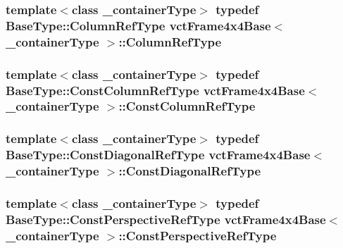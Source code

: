 \subsubsection[{Column\+Ref\+Type}]{\setlength{\rightskip}{0pt plus 5cm}template$<$class \+\_\+container\+Type$>$ typedef {\bf Base\+Type\+::\+Column\+Ref\+Type} {\bf vct\+Frame4x4\+Base}$<$ \+\_\+container\+Type $>$\+::{\bf Column\+Ref\+Type}}\label{classvct_frame4x4_base_a5c1b952e27a3cafa0cc196c2a36c33e7}
\hypertarget{classvct_frame4x4_base_a3942845e934c9ac1ede2d499f92a760b}{}
\subsubsection[{Const\+Column\+Ref\+Type}]{\setlength{\rightskip}{0pt plus 5cm}template$<$class \+\_\+container\+Type$>$ typedef {\bf Base\+Type\+::\+Const\+Column\+Ref\+Type} {\bf vct\+Frame4x4\+Base}$<$ \+\_\+container\+Type $>$\+::{\bf Const\+Column\+Ref\+Type}}\label{classvct_frame4x4_base_a3942845e934c9ac1ede2d499f92a760b}
\hypertarget{classvct_frame4x4_base_ae8ff29e1d404cc75dd2163bf99446d90}{}
\subsubsection[{Const\+Diagonal\+Ref\+Type}]{\setlength{\rightskip}{0pt plus 5cm}template$<$class \+\_\+container\+Type$>$ typedef {\bf Base\+Type\+::\+Const\+Diagonal\+Ref\+Type} {\bf vct\+Frame4x4\+Base}$<$ \+\_\+container\+Type $>$\+::{\bf Const\+Diagonal\+Ref\+Type}}\label{classvct_frame4x4_base_ae8ff29e1d404cc75dd2163bf99446d90}
\hypertarget{classvct_frame4x4_base_a47161d0a7598341722759640af9413e5}{}
\subsubsection[{Const\+Perspective\+Ref\+Type}]{\setlength{\rightskip}{0pt plus 5cm}template$<$class \+\_\+container\+Type$>$ typedef Base\+Type\+::\+Const\+Perspective\+Ref\+Type {\bf vct\+Frame4x4\+Base}$<$ \+\_\+container\+Type $>$\+::{\bf Const\+Perspective\+Ref\+Type}}\label{classvct_frame4x4_base_a47161d0a7598341722759640af9413e5}
\hypertarget{classvct_frame4x4_base_a1f3226ad5b15ec1edb95cfe760eacc4f}{}
